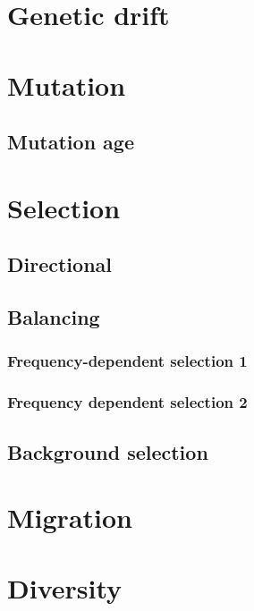 \documentclass[]{book}
\theoremstyle{definition}
\theoremstyle{definition}
\theoremstyle{definition}
\theoremstyle{remark}
\begin{document}
\chapter{Genetic drift}\label{genetic-drift}

\chapter{Mutation}\label{mutation}

\section{Mutation age}\label{mutation-age}

\chapter{Selection}\label{selection-1}

\section{Directional}\label{directional}

\section{Balancing}\label{balancing}

\subsection{Frequency-dependent selection
1}\label{frequency-dependent-selection-1}

\subsection{Frequency dependent selection
2}\label{frequency-dependent-selection-2}

\section{Background selection}\label{background-selection}

\chapter{Migration}\label{migration}

\chapter{Diversity}\label{diversity}
\end{document}
